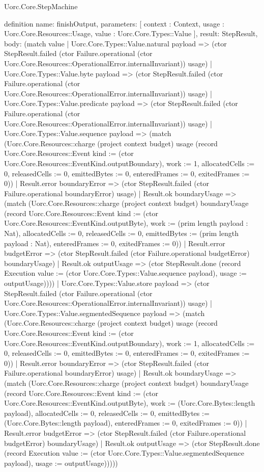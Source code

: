 \begin{lexlean}{Uorc.Core.StepMachine}
\begin{semanticmodule}
definition{
  name: finishOutput,
  parameters: [
    context : Context,
    usage : Uorc.Core.Resources::Usage,
    value : Uorc.Core.Types::Value
  ],
  result: StepResult,
  body: (match value
    | Uorc.Core.Types::Value.natural payload => (ctor StepResult.failed (ctor Failure.operational (ctor Uorc.Core.Resources::OperationalError.internalInvariant)) usage)
    | Uorc.Core.Types::Value.byte payload => (ctor StepResult.failed (ctor Failure.operational (ctor Uorc.Core.Resources::OperationalError.internalInvariant)) usage)
    | Uorc.Core.Types::Value.predicate payload => (ctor StepResult.failed (ctor Failure.operational (ctor Uorc.Core.Resources::OperationalError.internalInvariant)) usage)
    | Uorc.Core.Types::Value.sequence payload => (match (Uorc.Core.Resources::charge (project context budget) usage (record Uorc.Core.Resources::Event {kind := (ctor Uorc.Core.Resources::EventKind.outputBoundary), work := 1, allocatedCells := 0, releasedCells := 0, emittedBytes := 0, enteredFrames := 0, exitedFrames := 0}))
      | Result.error boundaryError => (ctor StepResult.failed (ctor Failure.operational boundaryError) usage)
      | Result.ok boundaryUsage => (match (Uorc.Core.Resources::charge (project context budget) boundaryUsage (record Uorc.Core.Resources::Event {kind := (ctor Uorc.Core.Resources::EventKind.outputByte), work := (prim length payload : Nat), allocatedCells := 0, releasedCells := 0, emittedBytes := (prim length payload : Nat), enteredFrames := 0, exitedFrames := 0}))
        | Result.error budgetError => (ctor StepResult.failed (ctor Failure.operational budgetError) boundaryUsage)
        | Result.ok outputUsage => (ctor StepResult.done (record Execution {value := (ctor Uorc.Core.Types::Value.sequence payload), usage := outputUsage}))))
    | Uorc.Core.Types::Value.store payload => (ctor StepResult.failed (ctor Failure.operational (ctor Uorc.Core.Resources::OperationalError.internalInvariant)) usage)
    | Uorc.Core.Types::Value.segmentedSequence payload => (match (Uorc.Core.Resources::charge (project context budget) usage (record Uorc.Core.Resources::Event {kind := (ctor Uorc.Core.Resources::EventKind.outputBoundary), work := 1, allocatedCells := 0, releasedCells := 0, emittedBytes := 0, enteredFrames := 0, exitedFrames := 0}))
      | Result.error boundaryError => (ctor StepResult.failed (ctor Failure.operational boundaryError) usage)
      | Result.ok boundaryUsage => (match (Uorc.Core.Resources::charge (project context budget) boundaryUsage (record Uorc.Core.Resources::Event {kind := (ctor Uorc.Core.Resources::EventKind.outputByte), work := (Uorc.Core.Bytes::length payload), allocatedCells := 0, releasedCells := 0, emittedBytes := (Uorc.Core.Bytes::length payload), enteredFrames := 0, exitedFrames := 0}))
        | Result.error budgetError => (ctor StepResult.failed (ctor Failure.operational budgetError) boundaryUsage)
        | Result.ok outputUsage => (ctor StepResult.done (record Execution {value := (ctor Uorc.Core.Types::Value.segmentedSequence payload), usage := outputUsage})))))
}


\end{semanticmodule}
\end{lexlean}
